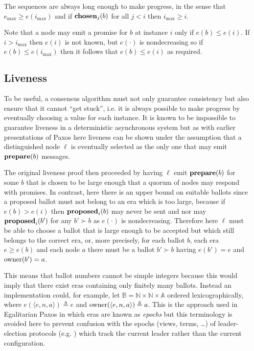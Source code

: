 \documentclass[journal]{IEEEtran}
\begin{document}
The sequences are always long enough to make progress, in the sense that
$e_\mathrm{max} \ge e(i_\mathrm{max})$ and if $\mathbf{chosen}_{j}(b)$ for all $j < i$
then $i_\mathrm{max} \ge i$.

Note that a node may emit a promise for $b$ at instance $i$ only if $e(b) \le
e(i)$.  If $i > i_\mathrm{max}$ then $e(i)$ is not known, but $e(\cdot)$ is
nondecreasing so if $e(b) \le e(i_\mathrm{max})$ then it follows that $e(b) \le
e(i)$ as required.

\subsection{Liveness}\label{liveness}

To be useful, a consensus algorithm must not only guarantee consistency but
also ensure that it cannot ``get stuck'', i.e. it is always possible to make
progress by eventually choosing a value for each instance. It is known to be
impossible to guarantee liveness in a deterministic asynchronous
system\cite{flp-impossibility} but as with earlier presentations of
Paxos\cite{paxos-made-simple} here liveness can be shown under the assumption
that a distinguished node $\ell$ is eventually selected as the only one that
may emit $\mathbf{prepare}(b)$ messages.

The original liveness proof then proceeded by having $\ell$ emit $\mathbf{prepare}(b)$ for
some $b$ that is chosen to be large enough that a quorum of nodes may respond
with promises. In contrast, here there is an upper bound on suitable ballots
since a proposed ballot must not belong to an era which is too large, because
if ${e(b) > e(i)}$ then $\mathbf{proposed}_{i}(b)$ may never be sent and nor may
$\mathbf{proposed}_{i}(b')$ for any $b' \succ b$ as $e(\cdot)$ is nondecreasing.  Therefore
here $\ell$ must be able to choose a ballot that is large enough to be accepted
but which still belongs to the correct era, or, more precisely, for each ballot
$b$, each era $e \ge e(b)$ and each node $a$ there must be a ballot $b' \succ
b$ having $e(b') = e$ and $\mathrm{owner}(b') = a$.

This means that ballot numbers cannot be simple integers because this would
imply that there exist eras containing only finitely many ballots. Instead an
implementation could, for example, let $\mathbb B = \mathbb N \times \mathbb N
\times \mathbb A$ ordered lexicographically, where $e(\langle e, n, a\rangle)
\triangleq e$ and $\mathrm{owner}(\langle e, n, a \rangle) \triangleq a$. This is the
approach used in Egalitarian Paxos\cite{egalitarian-paxos} in which eras are
known as \textit{epochs} but this terminology is avoided here to prevent
confusion with the epochs (views, terms, \ldots) of leader-election protocols
(e.g.  \cite{omega-meets-paxos}) which track the current leader rather than the
current configuration.
\end{document}
